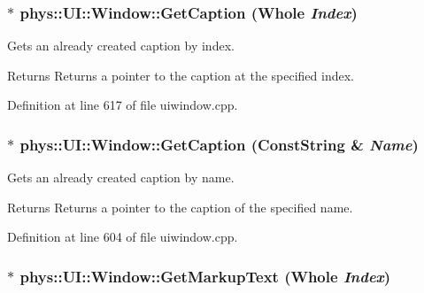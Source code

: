 \hypertarget{classphys_1_1UI_1_1Window_a06186f11ba6909d5271a86b317290adf}{
\subsubsection[{GetCaption}]{ $\ast$ phys::UI::Window::GetCaption ({\bf Whole} {\em Index})}}
\label{d4/d86/classphys_1_1UI_1_1Window_a06186f11ba6909d5271a86b317290adf}


Gets an already created caption by index. 

\begin{DoxyReturn}{Returns}
Returns a pointer to the caption at the specified index. 
\end{DoxyReturn}


Definition at line 617 of file uiwindow.cpp.

\hypertarget{classphys_1_1UI_1_1Window_acfc2669ecac2824bfa7cc53eb724d191}{
\subsubsection[{GetCaption}]{ $\ast$ phys::UI::Window::GetCaption ({\bf ConstString} \& {\em Name})}}
\label{d4/d86/classphys_1_1UI_1_1Window_acfc2669ecac2824bfa7cc53eb724d191}


Gets an already created caption by name. 

\begin{DoxyReturn}{Returns}
Returns a pointer to the caption of the specified name. 
\end{DoxyReturn}


Definition at line 604 of file uiwindow.cpp.

\hypertarget{classphys_1_1UI_1_1Window_a119b5ff513cb70d4190b3ccdfa980ac2}{
\subsubsection[{GetMarkupText}]{ $\ast$ phys::UI::Window::GetMarkupText ({\bf Whole} {\em Index})}}
\label{d4/d86/classphys_1_1UI_1_1Window_a119b5ff513cb70d4190b3ccdfa980ac2}


